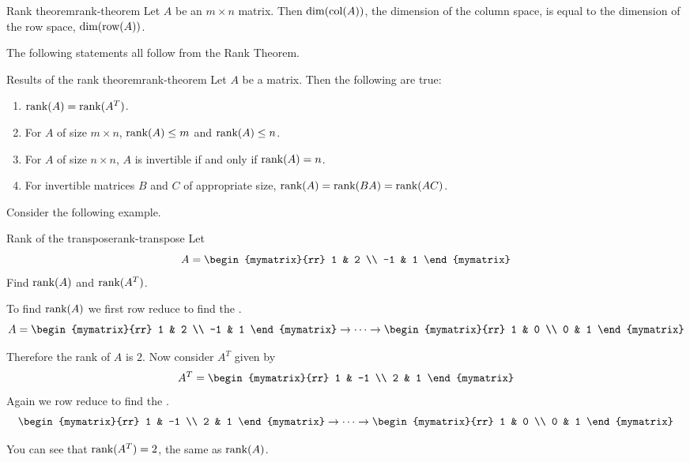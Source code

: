 \begin{theorem}{Rank theorem}{rank-theorem}
Let $A$ be an $m \times n$ matrix. Then $\mbox{\rm dim}(\mbox{\rm col} (A))$, the dimension of the column space, is equal to the dimension of the row space, $\mbox{\rm dim}(\mbox{\rm row}(A))$.
\end{theorem}

The following statements all follow from the Rank Theorem.

\begin{corollary}{Results of the rank theorem}{rank-theorem}
Let $A$ be a matrix. Then the following are true:
\begin{enumerate}
\item
 $\mbox{\rm rank}(A) = \mbox{\rm rank}(A^T)$.
\item
For $A$ of size $m \times n$, $\mbox{\rm rank}(A) \leq m$ and $\mbox{\rm rank}(A) \leq n$.
\item
For $A$ of size $n \times n$,  $A$ is invertible if and only if $\mbox{\rm rank}(A) = n$.
\item
For invertible matrices $B$ and $C$ of appropriate size, 
$\mbox{\rm rank}(A) = \mbox{\rm rank}(BA) = \mbox{\rm rank}(AC)$. 
\end{enumerate}
\end{corollary}

Consider the following example.

\begin{example}{Rank of the transpose}{rank-transpose}
Let \[
A = 
\begin{mymatrix}{rr}
1 & 2 \\
-1 & 1 
\end{mymatrix}
\]
Find $\mbox{\rm rank}(A)$ and $\mbox{\rm rank}(A^T)$.
\end{example}

\begin{solution}
To find $\mbox{\rm rank}(A)$ we first row reduce to find the {\rref}.
\[
A = 
\begin{mymatrix}{rr}
1 & 2 \\
-1 & 1 
\end{mymatrix}
\rightarrow \cdots \rightarrow
\begin{mymatrix}{rr}
1 & 0 \\
0 & 1 
\end{mymatrix}
\]

Therefore the rank of $A$ is $2$. Now consider $A^T$ given by 
\[
A^T = \begin{mymatrix}{rr}
1 & -1 \\
2 & 1 
\end{mymatrix}
\]
Again we row reduce to find the {\rref}.
\[
\begin{mymatrix}{rr}
1 & -1 \\
2 & 1 
\end{mymatrix}
\rightarrow \cdots \rightarrow
\begin{mymatrix}{rr}
1 & 0 \\
0 & 1 
\end{mymatrix}
\]

You can see that $\mbox{\rm rank}(A^T) = 2$, the same as $\mbox{\rm rank}(A)$. 
\end{solution}

